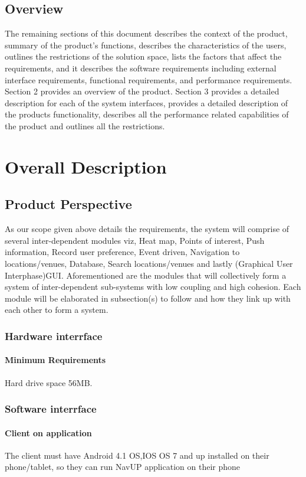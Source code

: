 \documentclass[11pt]{article}
\begin{document}
	\subsection{Overview}
	The remaining sections of this document describes the context of the product, summary of the product’s functions, describes the characteristics of the users, outlines the restrictions of the solution space, lists the factors that affect the requirements, and it describes the software requirements including external interface requirements, functional requirements,  and performance requirements. Section 2 provides an overview of the product. Section 3 provides a detailed description for each of the system interfaces, provides a detailed description of the products functionality, describes all the performance related capabilities of the product and outlines all the restrictions. 

	\section{Overall Description}
	
		\subsection{Product Perspective}
		As our scope given above details the requirements, the system will comprise of several inter-dependent modules viz, Heat map, Points of interest, Push information, Record user preference, Event driven, Navigation to locations/venues, Database, Search locations/venues and lastly (Graphical User Interphase)GUI. Aforementioned are the modules that will collectively form a system of inter-dependent sub-systems with low coupling and high cohesion. Each module will be elaborated in subsection(s) to follow and how they link up with each other to form a system. 
    \subsubsection{Hardware interrface}
			\paragraph{Minimum Requirements}
      Hard drive space 56MB.
		
		\subsubsection{Software interrface}
			\paragraph{Client on application}
      The client must have Android 4.1 OS,IOS OS 7 and up installed on their phone/tablet, so they can run  NavUP application on their phone
\end{document}
